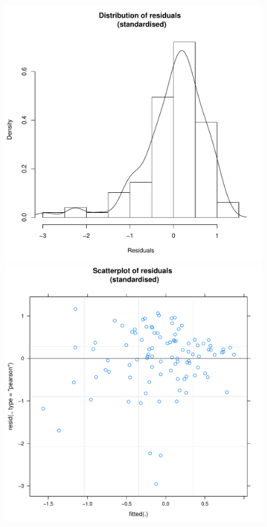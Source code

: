 \begin{CJK}{UTF8}{gbsn}
      \begin{figure}[!htbp]
   \includegraphics[scale =.4]{images/MLM3bHist.pdf}
        \includegraphics[scale =.4]{images/MLM3bScatter.pdf}

\end{figure}
\end{CJK}
